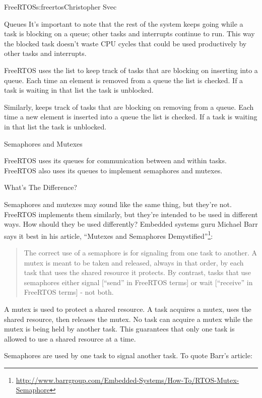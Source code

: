 \begin{aosachapter}{FreeRTOS}{s:freertos}{Christopher Svec}
\begin{aosasect1}{Queues}
It's important to note that the rest of the system keeps going while a
task is blocking on a queue; other tasks and interrupts continue to
run. This way the blocked task doesn't waste CPU cycles that could be
used productively by other tasks and interrupts.

FreeRTOS uses the  list to keep track of
tasks that are blocking on inserting into a queue. Each time an
element is removed from a queue the  list is
checked. If a task is waiting in that list the task is unblocked.

Similarly,  keeps track of tasks that are
blocking on removing from a queue.  Each time a new element is
inserted into a queue the  list is
checked. If a task is waiting in that list the task is unblocked.

\begin{aosasect2}{Semaphores and Mutexes}

FreeRTOS uses its queues for communication between and
within tasks.  FreeRTOS also uses its queues to implement semaphores
and mutexes.

\begin{aosasect3}{What's The Difference?}

Semaphores and mutexes may sound like the same thing, but they're
not. FreeRTOS implements them similarly, but they're intended to be
used in different ways.  How should they be used differently? Embedded
systems guru Michael Barr says it best in his article, ``Mutexes and
Semaphores
Demystified''\footnote{\url{http://www.barrgroup.com/Embedded-Systems/How-To/RTOS-Mutex-Semaphore}}:

\begin{quotation}
\noindent The correct use of a semaphore is for signaling from one task to another. A mutex 
is meant to be taken and released, always in that order, by each task that uses the 
shared resource it protects. By contrast, tasks that use semaphores either signal 
[``send'' in FreeRTOS terms] or wait [``receive'' in FreeRTOS terms] - not both.
\end{quotation}

A mutex is used to protect a shared resource. A task acquires a mutex,
uses the shared resource, then releases the mutex. No task can acquire
a mutex while the mutex is being held by another task. This guarantees
that only one task is allowed to use a shared resource at a time.

Semaphores are used by one task to signal another task. To quote
Barr's article:


\end{aosasect3}
\end{aosasect2}
\end{aosasect1}
\end{aosachapter}
